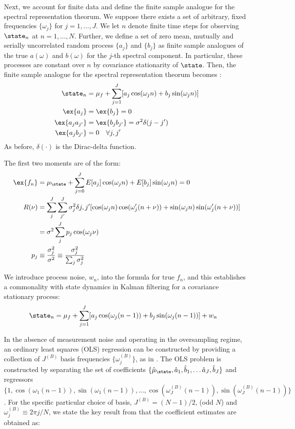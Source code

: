 Next, we account for finite data and define the finite sample analogue for the spectral representation theorum. We suppose there exists a set of arbitrary, fixed frequencies  $\{\omega_j\}$  for $j = 1, \hdots , J$. We let $n$ denote finite time steps for observing $\state_n$ at $n= 1, \hdots, N$. Further, we define a set of zero mean, mutually and serially uncorrelated random process  $\{a_j \}$ and $\{b_j\}$ as finite sample analogues of the true  $a(\omega)$ and $b(\omega)$ for the $j$-th spectral component. In particular, these processes are constant over $n$ by covariance stationarity of $\state$. Then, the finite sample analogue for the spectral representation theorum becomes \cite{hamilton1994time}:
\begin{align} 
\state_n &= \mu_f  + \sum_{j=1}^{J}  [ a_j \cos(\omega_j n) +  b_j \sin(\omega_j n) ] \\
\ex{a_j} & = \ex{b_j} = 0\\
\ex{a_ja_{j'}} &= \ex{b_jb_{j'}} = \sigma^2 \delta(j - j') \\
\ex{a_jb_{j'}} &= 0 \quad \forall j, j' 
\end{align} As before, $\delta(\cdot)$ is the Dirac-delta function. 

The first two moments are of the form:
\begin{align}
\ex{f_n} &=  \mu_\state +  \sum_{j=0}^{J} E[a_j] \cos(\omega_j n) + E[b_j] \sin(\omega_j n)  = 0\\
R(\nu) &= \sum_j^{J} \sum_{j'}^{J} \sigma_j^2\delta{j,j'} [\cos(\omega_j n)\cos(\omega_j' (n+\nu)) + \sin(\omega_j n)\sin(\omega_j' (n+\nu)) ]\\
&= \sigma^2 \sum_j^{J}  p_j \cos(\omega_j\nu) \label{eqn:app:spectral:Rvtrue} \\
p_j & \equiv \frac{\sigma_j^2}{\sigma^2} \equiv \frac{\sigma_j^2}{\sum_j \sigma_j^2} 
\end{align}

We introduce process noise, $w_n$, into the formula for true $f_n$, and this establishes a commonality with state dynamics in Kalman filtering for a covariance stationary process:
\begin{align} 
\state_n &= \mu_f  + \sum_{j=1}^{J}  [ a_j \cos(\omega_j (n-1)) +  b_j \sin(\omega_j (n-1)) ] + w_n 
\end{align}

In the absence of measurement noise and operating in the oversampling regime, an ordinary least squares (OLS) regression can be constructed by providing a collection of $J^{(B)}$ basis frequencies $\{\omega_j^{(B)}\}$, as in \cite{hamilton1994time}. The OLS problem is constructed by separating the set of coefficients $\{\hat{\mu}_\state, \hat{a}_1, \hat{b}_1, \hdots \hat{a}_J, \hat{b}_J\}$ and regressors $\{1,\cos(\omega_1 (n-1)), \sin(\omega_1 (n-1)), \hdots, \cos(\omega_J^{(B)} (n-1)), \sin(\omega_J^{(B)} (n-1)) \}$. For the specific particular choice of basis,  $J^{(B)} = (N-1)/2$, (odd $N$) and $\omega_j^{(B)} \equiv 2\pi j / N$, we state the key result from \cite{hamilton1994time} that the coefficient estimates are obtained as:


